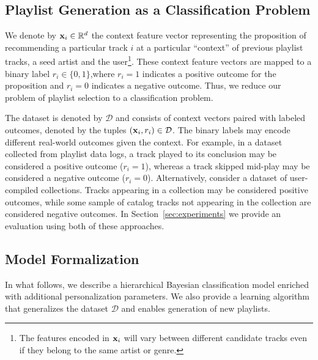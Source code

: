 

\subsection{Playlist Generation as a Classification Problem}
\label{sec:playlist_is_classification}
We denote by $\mathbf{x}_i \in \mathbb{R}^d$ the context feature vector representing the proposition of recommending a particular track $i$ at a particular ``context'' of previous playlist tracks, a seed artist and the user\footnote{The features encoded in $\mathbf{x}_i$  will vary between different candidate tracks even if they belong to the same artist or genre.}.  These context feature vectors are mapped to a binary label $r_i \in \{0,1\}$,where $r_i=1$ indicates a positive outcome for the proposition and $r_i=0$ indicates a negative outcome. Thus, we reduce our problem of playlist selection to a classification problem.

The dataset is denoted by $\mathcal{D}$ and consists of context vectors paired with labeled outcomes, denoted by the tuples $\left(\mathbf{x}_i,r_i\right) \in \mathcal{D}$.
The binary labels may encode different real-world outcomes  given the context. 
For example, in a dataset collected from playlist data logs, a track  played to its conclusion may be considered a positive outcome ($r_i=1$), whereas a track  skipped  mid-play may be considered a negative outcome ($r_i=0$). Alternatively, consider a dataset of user-compiled collections. Tracks appearing in a collection may be considered positive outcomes, while some sample of catalog tracks not appearing in the collection are considered negative outcomes.  In Section~\ref{sec:experiments} we provide an evaluation using both of these approaches. 


\subsection{Model Formalization}
In what follows, we describe a  hierarchical Bayesian classification model enriched with additional personalization parameters. We also provide a learning algorithm that generalizes the dataset $\mathcal{D}$ and enables generation of new playlists.


